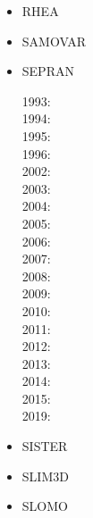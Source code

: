 \begin{itemize}
\item RHEA 

\cite{bugg08}
\cite{stgb10}
\cite{algs12}
\cite{busa13}

\item SAMOVAR
\cite{egat10}

\item SEPRAN 

1993: \cite{beky93}\cite{vavy93}\\
1994: \cite{vlvv94}\cite{vayv94}\\
1995: \cite{vayv95}\\
1996: \cite{vayu96}\\
2002: \cite{civv02}\cite{vavv02}\\
2003: \cite{vavs03}\\
2004: \cite{vavv04}\cite{vavv04b}\cite{vavv04c}\\
2005: \cite{vavv05}\cite{sepr05}\\
2006: \cite{liva06a}\cite{liva06b}\\
2007: \cite{vant07}\cite{civv07}\cite{brva07a}\cite{brva07b}\cite{knvk07}\\
2008: \cite{plva08}\cite{brhv08}\cite{knva08}\\
2009: \cite{vavl09}\\
2010: \cite{vahy10}\cite{syva10}\\
2011: \cite{vahs11}\\
2012: \cite{besy12}\cite{beva12}\cite{chgv12}\\
2013: \cite{ancv13}\\
2014: \cite{chsg14}\cite{mova14}\\
2015: \cite{vasy15}\\
2019: \cite{zhdv19}\cite{vayu19}

\item SISTER 

\cite{olbm16}

\item SLIM3D 

\cite{poso08}
\cite{qusp10}
\cite{brps12}
\cite{brps13}
\cite{brau13}
\cite{brun14}
\cite{hebr14}
\cite{kobf14}
\cite{clbq15}
\cite{brcr17}
\cite{basq18}

\item SLOMO


\end{itemize}
